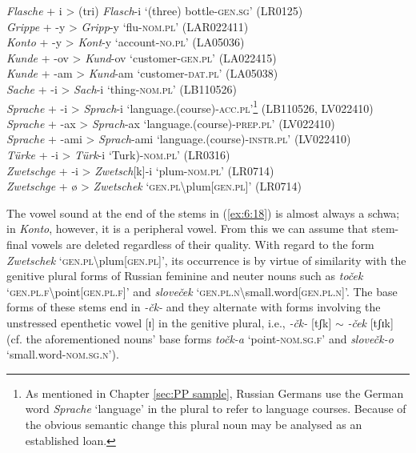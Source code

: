 \ea
\label{ex:6:18}
\textit{Flasche} + i > (tri) \textit{Flasch}-i `(three) bottle-\textsc{gen.sg}' (LR0125)\\
\textit{Grippe} + -y > \textit{Gripp}-y `flu-\textsc{nom.pl}' (LAR022411)\\
\textit{Konto} + -y > \textit{Kont}-y `account-\textsc{no.pl}' (LA05036)\\
\textit{Kunde} + -ov > \textit{Kund}-ov `customer-\textsc{gen.pl}' (LA022415)\\ 
\textit{Kunde} + -am > \textit{Kund}-am `customer-\textsc{dat.pl}' (LA05038)\\
\textit{Sache} + -i > \textit{Sach}-i `thing-\textsc{nom.pl}' (LB110526)\\
\textit{Sprache} + -i > \textit{Sprach}-i `language.(course)-\textsc{acc.pl}'\footnote{As mentioned in Chapter \ref{sec:PP sample}, Russian Germans use the German word \textit{Sprache} ‘language’ in the plural to refer to language courses. Because of the obvious semantic change this plural noun may be analysed as an established loan.} (LB110526, LV022410)\\
\textit{Sprache} + -ax > \textit{Sprach}-ax `language.(course)-\textsc{prep.pl}' (LV022410)\\
\textit{Sprache} + -ami > \textit{Sprach}-ami `language.(course)-\textsc{instr.pl}' (LV022410)\\
\textit{Türke} + -i > \textit{Türk}-i `Turk)-\textsc{nom.pl}' (LR0316)\\
\textit{Zwetschge} + -i > \textit{Zwetsch}[k]-i `plum-\textsc{nom.pl}' (LR0714)\\
\textit{Zwetschge} + \o{} > \textit{Zwetschek} `\textsc{gen.pl}\textbackslash plum[\textsc{gen.pl}]' (LR0714)\\
\z

\noindent The vowel sound at the end of the stems in (\ref{ex:6:18}) is almost always a schwa; in \textit{Konto}, however, it is a peripheral vowel. From this we can assume that stem-final vowels are deleted regardless of their quality. With regard to the form \textit{Zwetschek} `\textsc{gen.pl}\textbackslash{}plum[\textsc{gen.pl}]', its occurrence is by virtue of similarity with the genitive plural forms of Russian feminine and neuter nouns such as \textit{toček}  `\textsc{gen.pl.f}\textbackslash point[\textsc{gen.pl.f}]' and \textit{sloveček} `\textsc{gen.pl.n}\textbackslash small.word[\textsc{gen.pl.n}]'. The base forms of these stems end in \textit{-čk-} and they alternate with forms involving the unstressed epenthetic vowel [ɪ] in the genitive plural, i.e., \textit{-čk-} [tʃk] {$\sim$} \textit{-ček} [tʃɪk] (cf. the aforementioned nouns’ base forms \textit{točk-a} `point-\textsc{nom.sg.f}' and \textit{slovečk-o} `small.word-\textsc{nom.sg.n}'). 

